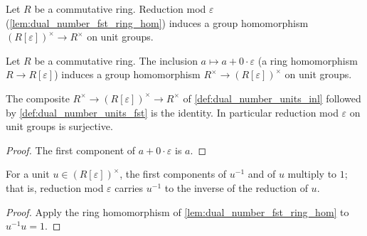 \begin{definition}\leanok
  \label{def:dual_number_units_fst}
  Let \(R\) be a commutative ring. Reduction mod \(\varepsilon\)
  (\cref{lem:dual_number_fst_ring_hom}) induces a group homomorphism
  \((R[\varepsilon])^{\times} \to R^{\times}\) on unit groups.
\end{definition}

\begin{definition}\leanok
  \label{def:dual_number_units_inl}
  Let \(R\) be a commutative ring. The inclusion
  \(a \mapsto a + 0 \cdot \varepsilon\) (a ring homomorphism
  \(R \to R[\varepsilon]\)) induces a group homomorphism
  \(R^{\times} \to (R[\varepsilon])^{\times}\) on unit groups.
\end{definition}

\begin{lemma}\leanok
  \label{lem:dual_number_units_fst_split}
  The composite
  \(R^{\times} \to (R[\varepsilon])^{\times} \to R^{\times}\)
  of \cref{def:dual_number_units_inl} followed by
  \cref{def:dual_number_units_fst} is the identity. In particular
  reduction mod \(\varepsilon\) on unit groups is surjective.
\end{lemma}

\begin{proof}\leanok
  The first component of \(a + 0\cdot\varepsilon\) is \(a\).
\end{proof}

\begin{lemma}\leanok
  \label{lem:dual_number_fst_unit_inv}
  For a unit \(u \in (R[\varepsilon])^{\times}\), the first components
  of \(u^{-1}\) and of \(u\) multiply to \(1\); that is, reduction mod
  \(\varepsilon\) carries \(u^{-1}\) to the inverse of the reduction of
  \(u\).
\end{lemma}

\begin{proof}\leanok
  Apply the ring homomorphism of
  \cref{lem:dual_number_fst_ring_hom} to \(u^{-1} u = 1\).
\end{proof}

